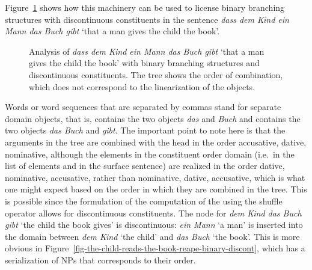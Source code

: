 \documentclass[output=paper
                ,modfonts
                ,nonflat
	        ,collection
	        ,collectionchapter
	        ,collectiontoclongg
 	        ,biblatex
                ,babelshorthands
                ,newtxmath
                ,draftmode
                ,colorlinks, citecolor=brown
]{./langsci/langscibook}
\begin{document}
Figure~\ref{fig-the-child-reads-the-book-reape-binary} shows how this machinery can be used to license binary
branching structures with discontinuous constituents in the sentence
\emph{dass dem Kind ein Mann das Buch gibt} `that a man gives the
child the book'.
\begin{figure}
\caption{\label{fig-the-child-reads-the-book-reape-binary}Analysis of \emph{dass dem Kind ein Mann das Buch
    gibt} `that a man gives the child the book' with binary branching structures and discontinuous
  constituents. The tree shows the order of combination, which does not correspond to the
  linearization of the \domain objects.}
\end{figure}%
Words or word sequences that are separated by commas stand for separate domain objects, that is,
 contains the two objects \emph{das} and \emph{Buch} and  contains the two objects \emph{das Buch} and \emph{gibt}.
The important point to note here is that the
arguments in the tree are combined with the head in the order
accusative, dative, nominative, although the elements in the
constituent order domain (i.e.\ in the list of \domain elements and in
the surface sentence) are realized in the order dative, nominative,
accusative, rather than nominative, dative, accusative, which is what
one might expect based on the order in which they are combined in the
tree. This is possible since the formulation of the computation of the \domv using the shuffle
operator allows for discontinuous constituents. The node for \emph{dem Kind das Buch gibt} `the
child the book gives' is discontinuous: \emph{ein Mann} `a man' is inserted into the domain between
\emph{dem Kind} `the child' and \emph{das Buch} `the book'.  This is more obvious in Figure~\ref{fig-the-child-reads-the-book-reape-binary-discont}, which has a serialization of NPs that
corresponds to their order.
\end{document}
